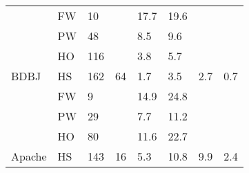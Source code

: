 \begin{figure*}[!t]
\begin{tabular}{|l|l|l|l|l|l|l|l|}
                                   & FW                              & 10                              &                                            & \cellcolor[HTML]{C0C0C0}17.7 & \cellcolor[HTML]{C0C0C0}19.6 &                       &                       \\ \cline{2-3} \cline{5-6}
                                   & PW                              & 48                              &                                            & \cellcolor[HTML]{C0C0C0}8.5  & \cellcolor[HTML]{C0C0C0}9.6  &                       &                       \\ \cline{2-3} \cline{5-6}
                                   & HO                              & \cellcolor[HTML]{FD6864}116                             &                                            & \cellcolor[HTML]{C0C0C0}3.8  & \cellcolor[HTML]{C0C0C0}5.7  &                       &                       \\ \cline{2-3} \cline{5-6}
\multirow{-4}{*}{BDBJ}             & HS                              & \cellcolor[HTML]{FD6864}162                             & \multirow{-4}{*}{64}                       & 1.7                          & 3.5                          & \multirow{-4}{*}{2.7} & \multirow{-4}{*}{0.7} \\ \hline
                                   & FW                              & 9                               &                                            & \cellcolor[HTML]{C0C0C0}14.9 & \cellcolor[HTML]{C0C0C0}24.8 &                       &                       \\ \cline{2-3} \cline{5-6}
                                   & PW                              & \cellcolor[HTML]{FD6864}29                              &                                            & \cellcolor[HTML]{C0C0C0}7.7  & \cellcolor[HTML]{C0C0C0}11.2 &                       &                       \\ \cline{2-3} \cline{5-6}
                                   & HO                              & \cellcolor[HTML]{FD6864}80                              &                                            & \cellcolor[HTML]{C0C0C0}11.6 & \cellcolor[HTML]{C0C0C0}22.7 &                       &                       \\ \cline{2-3} \cline{5-6}
\multirow{-4}{*}{Apache}           & HS                              & \cellcolor[HTML]{FD6864}143                             & \multirow{-4}{*}{16}                       & 5.3                          & 10.8                         & \multirow{-4}{*}{9.9} & \multirow{-4}{*}{2.4} \\ \hline

\end{tabular}
\end{figure*}
